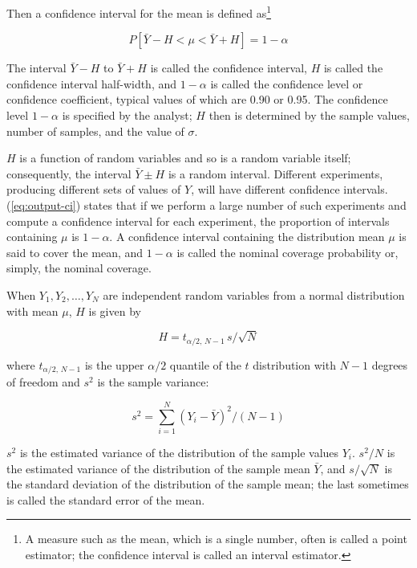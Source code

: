 Then a confidence interval for the mean is defined as\footnote{A measure such
as the mean, which is a single number, often is called a point estimator; the
confidence interval is called an interval estimator.}

\begin{equation}
P[\bar{Y} - H < \mu < \bar{Y} + H] = 1 - \alpha
\label{eq:output-ci}
\end{equation}

The interval $\bar{Y} - H$ to $\bar{Y} + H$ is called the confidence interval,
$H$ is called the confidence interval half-width, and $1 - \alpha$ is called
the confidence level or confidence coefficient, typical values of which are
0.90 or 0.95. The confidence level $1 - \alpha$ is specified by the analyst;
$H$ then is determined by the sample values, number of samples, and the value
of $\sigma$.

$H$ is a function of random variables and so is a random variable itself;
consequently, the interval $\bar{Y} \pm H$ is a random interval. Different
experiments, producing different sets of values of $Y$, will have different
confidence intervals. (\ref{eq:output-ci}) states that if we perform a large
number of such experiments and compute a confidence interval for each
experiment, the proportion of intervals containing $\mu$ is $1 - \alpha$. A
confidence interval containing the distribution mean $\mu$ is said to cover
the mean, and $1 - \alpha$ is called the nominal coverage probability or,
simply, the nominal coverage.

When $Y_1, Y_2, \ldots, Y_N$ are independent random variables from a normal
distribution with mean $\mu$, $H$ is given by

\begin{equation}
H = t_{\alpha/2,\,N-1}\, s / \sqrt{N}
\label{eq:output-ci-halfwidth}
\end{equation}

where $t_{\alpha/2,\,N-1}$ is the upper $\alpha/2$ quantile of the $t$
distribution with $N-1$ degrees of freedom and $s^2$ is the sample variance:

\begin{equation}
s^2 = \sum_{i=1}^{N} (Y_i - \bar{Y})^2 / (N - 1)
\label{eq:output-sample-variance}
\end{equation}

$s^2$ is the estimated variance of the distribution of the sample values
$Y_i$. $s^2 / N$ is the estimated variance of the distribution of the sample
mean $\bar{Y}$, and $s / \sqrt{N}$ is the standard deviation of the
distribution of the sample mean; the last sometimes is called the standard
error of the mean.

